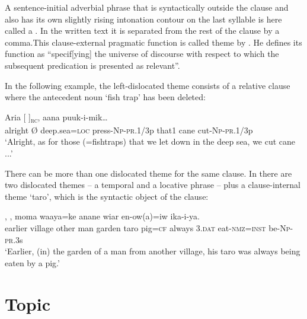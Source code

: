 A sentence-initial adverbial phrase that is syntactically outside the clause and also has its own slightly rising intonation contour on the last syllable is here called a . In the written text it is separated from the rest of the clause by a comma.This clause-external pragmatic function is called theme by \citet[19]{Dik1978}. He defines its function as ``specif[ying] the universe of discourse with respect to which the subsequent predication is presented as relevant''.

 In the following example, the left-dislocated theme consists of a relative clause where the antecedent noun  `fish trap' has been deleted:

\ea%
\label{ex:9:x1704}
\gll Aria  [\textstyleEmphasizedVernacularWords{{\O}}    ]\textsubscript{\textsc{rc}}, aana puuk-i-mik{\dots}\\
alright {\O} deep.sea=\textsc{loc} press-\textsc{Np}-\textsc{pr}.1/3p that1 cane cut-\textsc{Np}-\textsc{pr}.1/3p\\
\glt`Alright, as for those (=fishtraps) that we let down in the deep sea, we cut cane ...'
\z


There can be more than one dislocated theme for the same clause. In  there are two dislocated themes -- a temporal and a locative phrase -- plus a clause-internal theme  `taro', which is the syntactic object of the clause:

\ea%
\label{ex:9:x1700}
\gll {},      , moma  waaya=ke  anane  wiar  en-ow(a)=iw  ika-i-ya.\\
earlier  village  other  man  garden  taro pig=\textsc{cf}  always  3.\textsc{dat}  eat-\textsc{nmz}=\textsc{inst}  be-\textsc{Np}-\textsc{pr}.3s      \\
\glt`Earlier, (in) the garden of a man from another village, his taro was always being eaten by a pig.'
\z


\section{Topic} 

